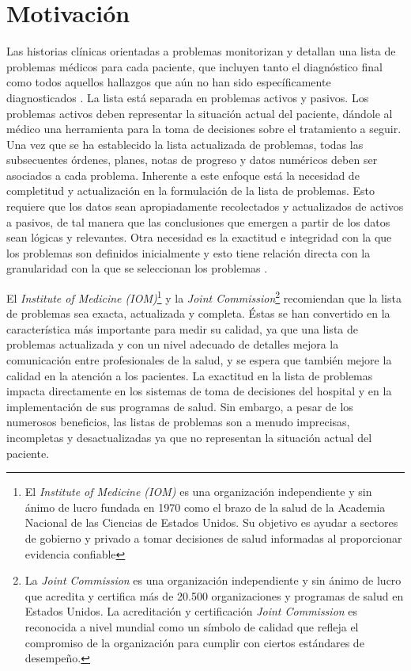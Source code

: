 \section{Motivación}
Las historias clínicas orientadas a problemas monitorizan y detallan una lista de problemas médicos para cada paciente, que incluyen  tanto el diagnóstico final como todos aquellos hallazgos que aún no han sido específicamente diagnosticados \cite{Weed1968}. La lista está separada en problemas activos y pasivos. Los problemas activos deben representar la situación actual del paciente, dándole al médico una herramienta para la toma de decisiones sobre el tratamiento a seguir. Una vez que se ha establecido la lista actualizada de problemas, todas las subsecuentes órdenes, planes, notas de progreso y datos numéricos deben ser asociados a cada problema. Inherente a este enfoque está la necesidad de completitud y actualización en la formulación de la lista de  problemas. Esto requiere que los datos sean apropiadamente recolectados y actualizados de activos a pasivos, de tal manera que las conclusiones que emergen a partir de los datos sean lógicas y relevantes. Otra necesidad es la exactitud e integridad con la que los problemas son definidos inicialmente y esto tiene relación directa con la granularidad con la que se seleccionan los problemas \cite{Luna2013}. 
 
El \textit{Institute of Medicine (IOM)}\footnote{El \textit{Institute of Medicine (IOM)} es una organización independiente y sin ánimo de lucro fundada en 1970 como el brazo de la salud de la Academia Nacional de las Ciencias de Estados Unidos. Su objetivo es ayudar a sectores de gobierno y privado a tomar decisiones de salud informadas al proporcionar evidencia confiable} y la \textit{Joint Commission}\footnote{La \textit{Joint Commission} es una organización independiente y sin ánimo de lucro que acredita y certifica más de 20.500 organizaciones y programas de salud en Estados Unidos. La acreditación y certificación \textit{Joint Commission} es reconocida a nivel mundial como un símbolo de calidad que refleja el compromiso de la organización para cumplir con ciertos estándares de desempeño.} recomiendan que la lista de problemas sea exacta, actualizada y completa. Éstas se han convertido en la característica más importante para medir su calidad, ya que una lista de problemas actualizada y con un nivel adecuado de detalles mejora la comunicación entre profesionales de la salud, y se espera que también mejore la calidad en la atención a los pacientes. La exactitud en la lista de problemas impacta directamente en los sistemas de toma de decisiones del hospital y en la implementación de sus  programas de salud. Sin embargo, a pesar de los numerosos beneficios, las listas de problemas son a menudo imprecisas, incompletas y desactualizadas ya que no representan la situación actual del paciente.
 
